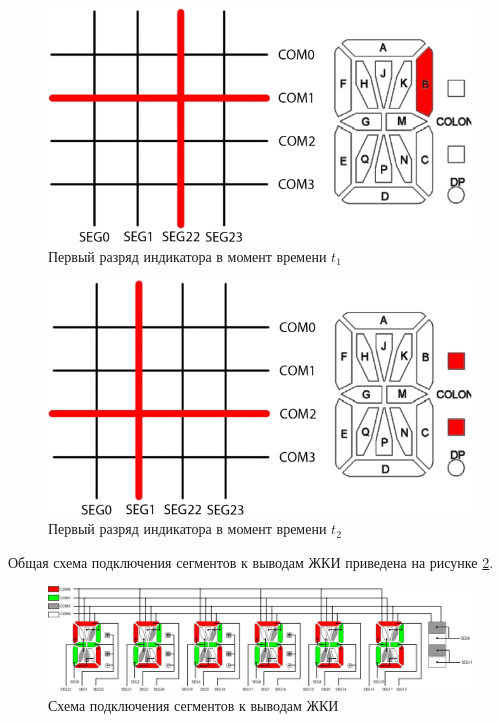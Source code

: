\begin{figure}[H]
\begin{center}
\includegraphics[scale=0.4]{Image/33.jpg} 
\end{center}
\caption{Первый разряд индикатора в момент времени $t_1$}
\end{figure}


\begin{figure}[H]
\begin{center}
\includegraphics[scale=0.4]{Image/34.jpg} 
\end{center}
\caption{Первый разряд индикатора в момент времени $t_2$}\label{t31}
\end{figure}

Общая схема подключения сегментов к выводам ЖКИ \cite{scheme} приведена на рисунке \ref{shema}.


\begin{figure}[H]
\begin{center}
\includegraphics[scale=0.33]{Image/35.jpg} 
\end{center}
\caption{Схема подключения сегментов к выводам ЖКИ}\label{shema}
\end{figure}

